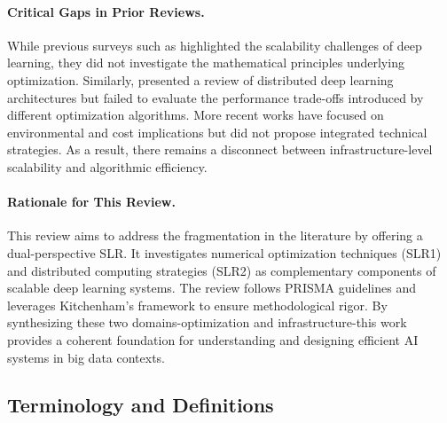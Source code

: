 \documentclass[acmsmall]{acmart}
\begin{document}
\paragraph{Critical Gaps in Prior Reviews.}
While previous surveys such as \citet{najafabadi2015deep} highlighted the scalability challenges of deep learning, they did not investigate the mathematical principles underlying optimization.
Similarly, \citet{zhang2019deep} presented a review of distributed deep learning architectures but failed to evaluate the performance trade-offs introduced by different optimization algorithms.
More recent works \citet{thompson2020computational} have focused on environmental and cost implications but did not propose integrated technical strategies. As a result, there remains a disconnect
between infrastructure-level scalability and algorithmic efficiency.

\paragraph{Rationale for This Review.}
This review aims to address the fragmentation in the literature by offering a dual-perspective SLR.
It investigates numerical optimization techniques (SLR1) and distributed computing strategies (SLR2) as complementary components of scalable deep learning systems. The review follows PRISMA guidelines \citep{moher2009preferred} and leverages Kitchenham's framework \citep{kitchenham2007guidelines} to ensure methodological rigor. By synthesizing these two domains-optimization and infrastructure-this work provides a coherent foundation for understanding and designing efficient AI systems in big data contexts.

\subsection{Terminology and Definitions}\label{subsec:terminology-and-definitions}
\end{document}
